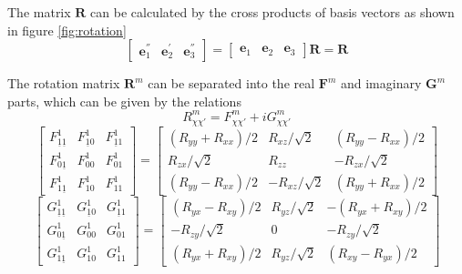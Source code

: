 The matrix $\mathbf{R}$ can be calculated by the cross products of
basis vectors as shown in figure \ref{fig:rotation}
\begin{equation}
\left[\begin{array}{ccc}
\mathbf{e}_{1}^{''} & \mathbf{e}_{2}^{'} & \mathbf{e}_{3}^{''}\end{array}\right]=\left[\begin{array}{ccc}
\mathbf{e}_{1} & \mathbf{e}_{2} & \mathbf{e}_{3}\end{array}\right]\mathbf{R}=\mathbf{R}
\end{equation}


The rotation matrix $\mathbf{R}^{m}$ can be separated into the real
$\mathbf{F}^{m}$ and imaginary $\mathbf{G}^{m}$ parts, which can
be given by the relations
\begin{equation}
R_{\chi\chi'}^{m}=F_{\chi\chi'}^{m}+iG_{\chi\chi'}^{m}
\end{equation}
\begin{equation}
\left[\begin{array}{ccc}
F_{\underline{1}\underline{1}}^{1} & F_{\underline{1}0}^{1} & F_{\underline{1}1}^{1}\\
F_{0\underline{1}}^{1} & F_{00}^{1} & F_{01}^{1}\\
F_{1\underline{1}}^{1} & F_{10}^{1} & F_{11}^{1}
\end{array}\right]=\left[\begin{array}{ccc}
\left(R_{yy}+R_{xx}\right)/2 & R_{xz}/\sqrt{2} & \left(R_{yy}-R_{xx}\right)/2\\
R_{zx}/\sqrt{2} & R_{zz} & -R_{zx}/\sqrt{2}\\
\left(R_{yy}-R_{xx}\right)/2 & -R_{xz}/\sqrt{2} & \left(R_{yy}+R_{xx}\right)/2
\end{array}\right]
\end{equation}
\begin{equation}
\left[\begin{array}{ccc}
G_{\underline{1}\underline{1}}^{1} & G_{\underline{1}0}^{1} & G_{\underline{1}1}^{1}\\
G_{0\underline{1}}^{1} & G_{00}^{1} & G_{01}^{1}\\
G_{1\underline{1}}^{1} & G_{10}^{1} & G_{11}^{1}
\end{array}\right]=\left[\begin{array}{ccc}
\left(R_{yx}-R_{xy}\right)/2 & R_{yz}/\sqrt{2} & -\left(R_{yx}+R_{xy}\right)/2\\
-R_{zy}/\sqrt{2} & 0 & -R_{zy}/\sqrt{2}\\
\left(R_{yx}+R_{xy}\right)/2 & R_{yz}/\sqrt{2} & \left(R_{xy}-R_{yx}\right)/2
\end{array}\right]
\end{equation}



